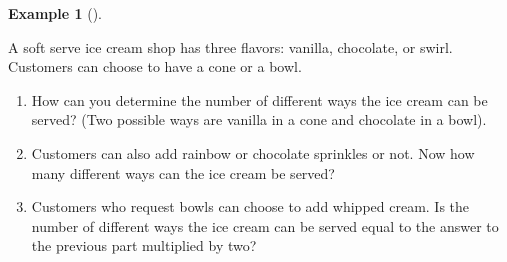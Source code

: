 \documentclass[
  letterpaper,
  DIV=11,
  numbers=noendperiod]{scrreprt}
\providecommand{\tightlist}{%
  \setlength{\itemsep}{0pt}\setlength{\parskip}{0pt}}
\theoremstyle{plain}
\theoremstyle{definition}
\newtheorem{example}{Example}[chapter]
\theoremstyle{definition}
\theoremstyle{definition}
\theoremstyle{remark}
\begin{document}
\begin{tcolorbox}[enhanced jigsaw, opacityback=0, left=2mm, colframe=quarto-callout-note-color-frame, toprule=.15mm, breakable, colback=white, leftrule=.75mm, arc=.35mm, rightrule=.15mm, bottomrule=.15mm]

\begin{example}[]\protect\hypertarget{exm-counting-icecream}{}\label{exm-counting-icecream}

A soft serve ice cream shop has three flavors: vanilla, chocolate, or
swirl. Customers can choose to have a cone or a bowl.

\begin{enumerate}
\def\labelenumi{\arabic{enumi}.}
\tightlist
\item
  How can you determine the number of different ways the ice cream can
  be served? (Two possible ways are vanilla in a cone and chocolate in a
  bowl).
\item
  Customers can also add rainbow or chocolate sprinkles\footnotemark{}
  or not. Now how many different ways can the ice cream be served?
\item
  Customers who request bowls can choose to add whipped cream. Is the
  number of different ways the ice cream can be served equal to the
  answer to the previous part multiplied by two?
\end{enumerate}

\end{example}

\end{tcolorbox}

\end{document}
